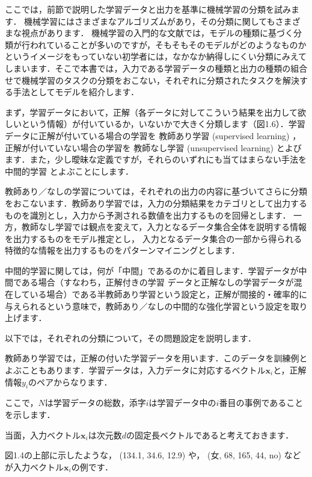 
ここでは，前節で説明した学習データと出力を基準に機械学習の分類を試みます．
機械学習にはさまざまなアルゴリズムがあり，その分類に関してもさまざまな視点があります．
機械学習の入門的な文献では，モデルの種類に基づく分類が行われていることが多いのですが，そもそもそのモデルがどのようなものかというイメージをもっていない初学者には，なかなか納得しにくい分類にみえてしまいます．そこで本書では，入力である学習データの種類と出力の種類の組合せで機械学習のタスクの分類をおこない，それぞれに分類されたタスクを解決する手法としてモデルを紹介します．

まず，学習データにおいて，正解（各データに対してこういう結果を出力して欲しいという情報）が付いているか，いないかで大きく分類します（図1.6）．学習データに正解が付いている場合の学習を
教師あり学習  (supervised learning) 
，正解が付いていない場合の学習を
教師なし学習  (unsupervised learning)
とよびます．また，少し曖昧な定義ですが，それらのいずれにも当てはまらない手法を
中間的学習 
とよぶことにします．

教師あり／なしの学習については，それぞれの出力の内容に基づいてさらに分類をおこないます．教師あり学習では，入力の分類結果をカテゴリとして出力するものを識別とし，入力から予測される数値を出力するものを回帰とします．
一方，教師なし学習では観点を変えて，入力となるデータ集合全体を説明する情報を出力するものをモデル推定とし，
入力となるデータ集合の一部から得られる特徴的な情報を出力するものをパターンマイニングとします．

中間的学習に関しては，何が「中間」であるのかに着目します．学習データが中間である場合（すなわち，正解付きの学習
データと正解なしの学習データが混在している場合）である半教師あり学習という設定と，正解が間接的・確率的に与えられるという意味で，教師あり／なしの中間的な強化学習という設定を取り上げます．

以下では，それぞれの分類について，その問題設定を説明します．


教師あり学習では，正解の付いた学習データを用います．このデータを訓練例とよぶこともあります．学習データは，入力データに対応するベクトル$\bm{x}_i$と，正解情報$y_i$のペアからなります．

ここで，$N$は学習データの総数，添字$i$は学習データ中の$i$番目の事例であることを示します．

当面，入力ベクトル$\bm{x}_i$は次元数$d$の固定長ベクトルであると考えておきます．

図1.4の上部に示したような， (134.1, 34.6, 12.9) や， (女, 68, 165, 44, no) などが入力ベクトル$\bm{x}_i$の例です．

